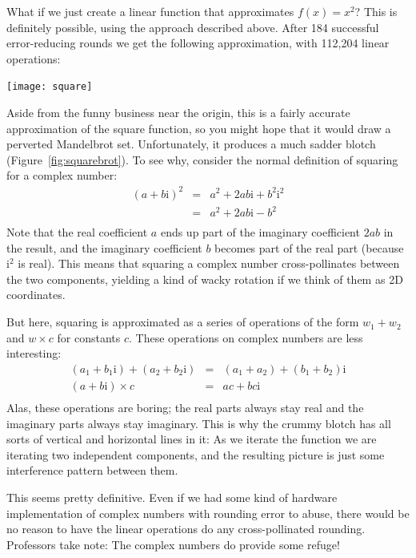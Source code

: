 \documentclass[twocolumn]{article}
\begin{document}
What if we just create a linear function that approximates $f(x) = x^2$?
This is definitely possible, using the approach described above. After
184 successful error-reducing rounds we get the following approximation,
with 112,204 linear operations:

\begin{center}
\texttt{[image: square]}
\end{center}

Aside from the funny business near the origin, this is a fairly
accurate approximation of the square function, so you might hope that
it would draw a perverted Mandelbrot set. Unfortunately, it produces
a much sadder blotch (Figure~\ref{fig:squarebrot}). To see why, consider
the normal definition of squaring for a complex number:
%
\[
\begin{array}{rcl}
  (a + b\mathrm{i})^2 & = & a^2 + 2ab\mathrm{i} + b^2\mathrm{i}^2 \\
                      & = & a^2 + 2ab\mathrm{i} - b^2 \\
\end{array}
\]
%
Note that the real coefficient $a$ ends up part of the imaginary
coefficient $2ab$ in the result, and the imaginary coefficient $b$
becomes part of the real part (because $\mathrm{i}^2$ is real). This
means that squaring a complex number cross-pollinates between the two
components, yielding a kind of wacky rotation if we think of them as
2D coordinates.

But here, squaring is approximated as a series of operations
of the form $w_1 + w_2$ and $w \times c$ for constants $c$.
These operations on complex numbers are less interesting:
%
\[
\begin{array}{rcl}
  (a_1 + b_1\mathrm{i}) + (a_2 + b_2\mathrm{i}) & = & (a_1 + a_2) + (b_1 + b_2)\mathrm{i} \\[1em]
  (a + b\mathrm{i}) \times c & = & ac + bc\mathrm{i} \\
\end{array}
\]
%
Alas, these operations are boring; the real parts always stay real and
the imaginary parts always stay imaginary. This is why the crummy
blotch has all sorts of vertical and horizontal lines in it: As we
iterate the function we are iterating two independent components, and
the resulting picture is just some interference pattern between them.

This seems pretty definitive. Even if we had some kind of hardware
implementation of complex numbers with rounding error to abuse, there
would be no reason to have the linear operations do any
cross-pollinated rounding. Professors take note: The complex numbers
do provide some refuge!
\end{document}

